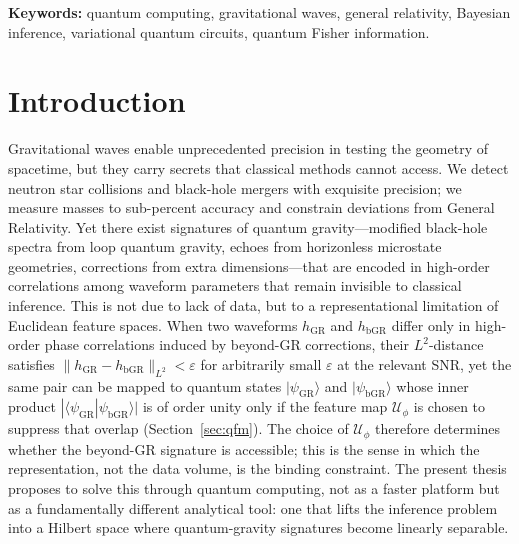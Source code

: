 \documentclass[11pt,a4paper, english]{book}
\theoremstyle{plain}
\theoremstyle{definition}
\numberwithin{equation}{chapter}
\numberwithin{figure}{chapter}
\numberwithin{table}{chapter}
\begin{document}
\vspace{0.4cm}
\textbf{Keywords:} quantum computing, gravitational waves, general relativity, Bayesian inference, variational
quantum circuits, quantum Fisher information.

\mainmatter


\chapter{Introduction}
\label{chap:introduction}

Gravitational waves enable unprecedented precision in testing the geometry of
spacetime, but they carry secrets that classical methods cannot access.
We detect neutron star collisions and black-hole mergers with exquisite precision;
we measure masses to sub-percent accuracy and constrain deviations from General
Relativity.
Yet there exist signatures of quantum gravity—modified black-hole spectra from
loop quantum gravity, echoes from horizonless microstate geometries, corrections
from extra dimensions—that are encoded in high-order correlations among waveform
parameters that remain invisible to classical inference.
This is not due to lack of data, but to a representational limitation of Euclidean
feature spaces.
When two waveforms $h_{\mathrm{GR}}$ and $h_{\mathrm{bGR}}$ differ only in
high-order phase correlations induced by beyond-GR corrections, their
$L^2$-distance satisfies
$\|h_{\mathrm{GR}} - h_{\mathrm{bGR}}\|_{L^2} < \varepsilon$
for arbitrarily small $\varepsilon$ at the relevant SNR, yet the same pair can be
mapped to quantum states $|\psi_{\mathrm{GR}}\rangle$ and
$|\psi_{\mathrm{bGR}}\rangle$ whose inner product
$|\langle\psi_{\mathrm{GR}}|\psi_{\mathrm{bGR}}\rangle|$ is of order unity only
if the feature map $\mathcal{U}_\phi$ is chosen to suppress that overlap
(Section~\ref{sec:qfm}).
The choice of $\mathcal{U}_\phi$ therefore determines whether the beyond-GR
signature is accessible; this is the sense in which the representation, not the
data volume, is the binding constraint.
The present thesis proposes to solve this through quantum computing, not as a
faster platform but as a fundamentally different analytical tool: one that lifts
the inference problem into a Hilbert space where quantum-gravity signatures become
linearly separable.
\end{document}
